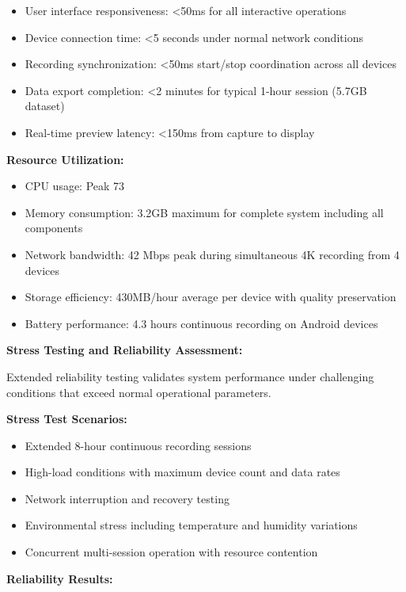 \documentclass[12pt,a4paper]{report}
\begin{document}
\begin{itemize}
\item User interface responsiveness: <50ms for all interactive operations
\item Device connection time: <5 seconds under normal network conditions
\item Recording synchronization: <50ms start/stop coordination across all devices
\item Data export completion: <2 minutes for typical 1-hour session (5.7GB dataset)
\item Real-time preview latency: <150ms from capture to display

\end{itemize}
\textbf{Resource Utilization:}

\begin{itemize}
\item CPU usage: Peak 73%
\item Memory consumption: 3.2GB maximum for complete system including all components
\item Network bandwidth: 42 Mbps peak during simultaneous 4K recording from 4 devices
\item Storage efficiency: 430MB/hour average per device with quality preservation
\item Battery performance: 4.3 hours continuous recording on Android devices

\end{itemize}
\textbf{Stress Testing and Reliability Assessment:}

Extended reliability testing validates system performance under challenging conditions that exceed normal operational
parameters.

\textbf{Stress Test Scenarios:}

\begin{itemize}
\item Extended 8-hour continuous recording sessions
\item High-load conditions with maximum device count and data rates
\item Network interruption and recovery testing
\item Environmental stress including temperature and humidity variations
\item Concurrent multi-session operation with resource contention

\end{itemize}
\textbf{Reliability Results:}
\end{document}
